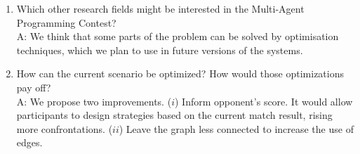 \begin{enumerate}
	\item  Which other research fields might be interested in the Multi-Agent Programming Contest?\\
	A: We think that some parts of the problem can be solved by optimisation techniques, which we plan to use in future versions of the systems.%
	
	\item  How can the current scenario be optimized? How would those optimizations pay off? \\
	A: We propose two improvements. ($i$) Inform opponent's score. It would allow participants to design strategies based on the current match result, rising more confrontations. ($ii$) Leave the graph less connected to increase the use of edges.%
	
	
\end{enumerate}